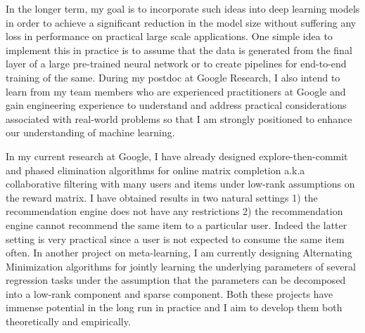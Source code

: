 \documentclass[paper=a4, fontsize=12pt]{article}
\begin{document}
In the longer term, my goal is to incorporate such ideas into deep learning models in order to achieve a significant reduction in the model size without suffering any loss in performance on practical large scale applications. One simple idea to implement this in practice is to assume that the data is generated from the final layer of a large pre-trained neural network or to create pipelines for end-to-end training of the same. During my postdoc at Google Research, I also intend to learn from my team members who are experienced practitioners at Google and gain engineering experience to understand and address practical considerations associated with real-world problems so that I am strongly positioned to enhance our understanding of machine learning. 

In my current research at Google, I have already designed explore-then-commit and phased elimination algorithms for online matrix completion a.k.a collaborative filtering with many users and items under low-rank assumptions on the reward matrix. I have obtained results in two natural settings 1) the recommendation engine does not have any restrictions 2) the recommendation engine cannot recommend the same item to a particular user. Indeed the latter setting is very practical since a user is not expected to consume the same item often. In another project on meta-learning, I am currently designing Alternating Minimization algorithms for jointly learning the underlying parameters of several regression tasks under the assumption that the parameters can be decomposed into a low-rank component and sparse component. Both these projects have immense potential in the long run in practice and I aim to develop them  both theoretically and empirically.
\end{document}
